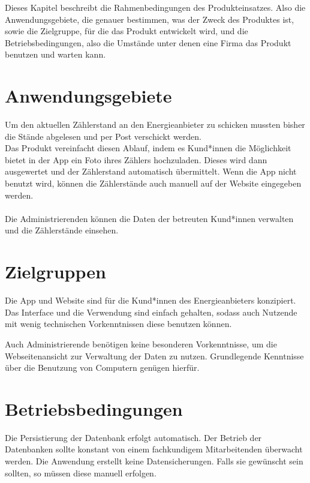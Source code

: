 Dieses Kapitel beschreibt die Rahmenbedingungen des Produkteinsatzes. Also die Anwendungsgebiete, die genauer bestimmen, was der Zweck des Produktes ist, sowie die Zielgruppe, für die das Produkt entwickelt wird,
und die Betriebsbedingungen, also die Umstände unter denen eine Firma das Produkt benutzen und warten kann.

\section{Anwendungsgebiete}
	Um den aktuellen Zählerstand an den Energieanbieter zu schicken mussten bisher die Stände abgelesen und per Post verschickt 		  
	werden. \\
	Das Produkt vereinfacht diesen Ablauf, indem es Kund*innen die Möglichkeit bietet in der App ein Foto ihres Zählers hochzuladen. Dieses wird dann 	
	ausgewertet und der Zählerstand  automatisch übermittelt.
	Wenn die App nicht benutzt wird, können die Zählerstände auch manuell auf der Website eingegeben werden.\\\\
	Die Administrierenden können die Daten der betreuten Kund*innen verwalten und die Zählerstände einsehen.
\section{Zielgruppen}
	Die App und Website sind für die Kund*innen des Energieanbieters konzipiert. Das Interface und die Verwendung sind einfach gehalten, sodass auch Nutzende mit wenig
	technischen Vorkenntnissen diese benutzen können.
	
	Auch Administrierende benötigen keine besonderen Vorkenntnisse, um die Webseitenansicht zur Verwaltung der Daten zu nutzen.
	Grundlegende Kenntnisse über die Benutzung von Computern genügen hierfür.
	
\section{Betriebsbedingungen}
	Die Persistierung der Datenbank erfolgt automatisch. Der Betrieb der Datenbanken sollte konstant von einem fachkundigem Mitarbeitenden überwacht werden.
	Die Anwendung erstellt keine Datensicherungen. Falls sie gewünscht sein sollten, so müssen diese manuell erfolgen.
	
